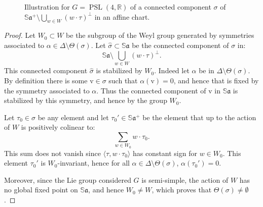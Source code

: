 \documentclass[reqno,10pt]{amsart}
\theoremstyle{plain}
\theoremstyle{definition}
\theoremstyle{remark}
\newcommand{\type}{\tau}
\newcommand{\typeS}{{\tau_0}}
\newcommand{\R}{\mathbb{R}}
\newcommand{\Sph}{\mathbb{S}}
\DeclareMathOperator{\PSL}{PSL}
\begin{document}
\begin{figure}
\begin{center}
\end{center}
\caption{Illustration for $G=\PSL(4,\R)$ of a connected component $\sigma$ of $\Sph\mathfrak{a}^+\setminus \bigcup_{w\in W} (w\cdot \type)^\perp$ in an affine chart.}
\label{fig:WeylSL4Cut}
\end{figure}

\medskip

\begin{proof}
Let $W_0\subset W$ be the subgroup of the Weyl group generated by symmetries associated to $\alpha\in \Delta\setminus \Theta(\sigma)$. Let $\hat{\sigma}\subset \Sph\mathfrak{a}$ be the connected component of $\sigma$ in: $$\Sph\mathfrak{a}\setminus \bigcup_{w\in W} (w\cdot \type)^\perp.$$
This connected component $\hat{\sigma}$ is stabilized by $W_0$. Indeed let $\alpha$ be in $\Delta\setminus \Theta(\sigma)$. By definition there is some $\mathrm{v}\in \sigma$ such that $\alpha(\mathrm{v})=0$, and hence that is fixed by the symmetry associated to $\alpha$. Thus the connected component of $\mathrm{v}$ in $\Sph\mathfrak{a}$ is stabilized by this symmetry, and hence by the group $W_0$.

\medskip

 Let $\typeS\in \sigma$ be any element and let $\typeS'\in \Sph\mathfrak{a}^+$ be the element that up to the action of $W$ is positively colinear to:
$$\sum_{w\in W_0} w\cdot \typeS.$$
This sum does not vanish since $\langle \type,w\cdot\typeS\rangle$ has constant sign for $w\in W_0$.
This element $\typeS'$ is $W_0$-invariant, hence for all $\alpha \in \Delta\setminus \Theta(\sigma)$, $\alpha(\typeS')=0$.

\medskip

Moreover, since the Lie group considered $G$ is semi-simple, the action of $W$ has no global fixed point on $\Sph\mathfrak{a}$, and hence $W_0\neq W$, which proves that $ \Theta(\sigma)\neq \emptyset$.
\end{proof}
\end{document}
